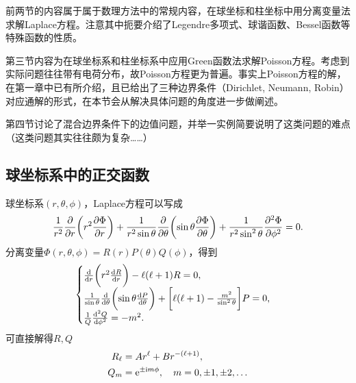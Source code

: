 前两节的内容属于属于数理方法中的常规内容，在球坐标和柱坐标中用分离变量法求解Laplace方程。注意其中扼要介绍了Legendre多项式、球谐函数、Bessel函数等特殊函数的性质。

第三节内容为在球坐标系和柱坐标系中应用Green函数法求解Poisson方程。考虑到实际问题往往带有电荷分布，故Poisson方程更为普遍。事实上Poisson方程的解，在第一章中已有所介绍，且已给出了三种边界条件（Dirichlet, Neumann, Robin）对应通解的形式，在本节会从解决具体问题的角度进一步做阐述。

第四节讨论了混合边界条件下的边值问题，并举一实例简要说明了这类问题的难点（这类问题其实往往颇为复杂……）

\subsection{球坐标系中的正交函数}
球坐标系$(r,\theta,\phi)$，Laplace方程可以写成
\begin{equation}
    \label{eqn:Laplace in spherical}
    \frac1{r^2}\pp r\biggkh{r^2\pv\Phi r}+\frac1{r^2\sin\theta}\pp\theta\biggkh{\sin\theta\pv\Phi\theta}+\frac1{r^2\sin^2\theta}\pv[2]\Phi\phi=0.
\end{equation}
分离变量$\Phi(r,\theta,\phi)=R(r)P(\theta)Q(\phi)$，得到 
\[
    \begin{cases}
        \dd r\biggkh{r^2\dv Rr}-\ell(\ell+1)R=0,\\
        \frac1{\sin\theta}\dd\theta\biggkh{\sin\theta\dv P\theta}+\biggfkh{\ell(\ell+1)-\frac{m^2}{\sin^2\theta}}P=0,\\
        \frac1Q\dv[2]Q\phi=-m^2.
    \end{cases}
\]
可直接解得$R,Q$
\begin{align}
    R_\ell&=Ar^\ell+Br^{-(\ell+1)},\\
    Q_m&=\mathop{}\!\mathrm{e}^{\pm\mathrm{i} m\phi},\quad m=0,\pm 1,\pm 2,\ldots
\end{align}
